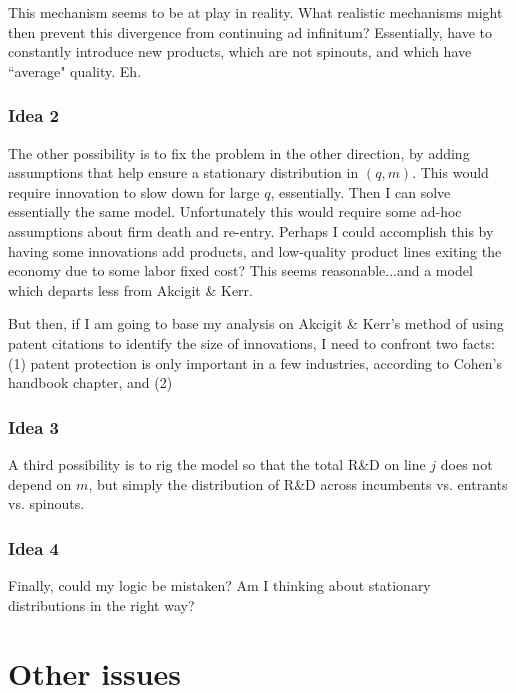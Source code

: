\documentclass[12pt,english]{article}
\theoremstyle{remark}
\begin{document}
This mechanism seems to be at play in reality. What realistic mechanisms might then prevent this divergence from continuing ad infinitum? Essentially, have to constantly introduce new products, which are not spinouts, and which have ``average" quality. Eh.  

\subsubsection{Idea 2}

The other possibility is to fix the problem in the other direction, by adding assumptions that help ensure a stationary distribution in $(q,m)$. This would require innovation to slow down for large $q$, essentially. Then I can solve essentially the same model. Unfortunately this would require some ad-hoc assumptions about firm death and re-entry. Perhaps I could accomplish this by having some innovations add products, and low-quality product lines exiting the economy due to some labor fixed cost? This seems reasonable...and a model which departs less from Akcigit \& Kerr. 

But then, if I am going to base my analysis on Akcigit \& Kerr's method of using patent citations to identify the size of innovations, I need to confront two facts: (1) patent protection is only important in a few industries, according to Cohen's handbook chapter, and (2) 

\subsubsection{Idea 3}

A third possibility is to rig the model so that the total R\&D on line $j$ does not depend on $m$, but simply the distribution of R\&D across incumbents vs. entrants vs. spinouts. 

\subsubsection{Idea 4}

Finally, could my logic be mistaken? Am I thinking about stationary distributions in the right way? 






\section{Other issues}
\end{document}
